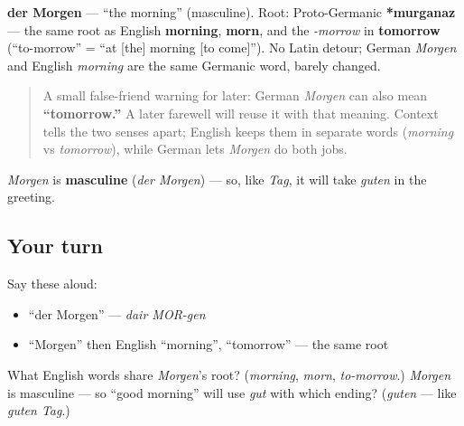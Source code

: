 \begin{cousinweb}
\textbf{der Morgen} — \textquotedblleft{}the morning\textquotedblright{} (masculine). Root: Proto-Germanic \textbf{*murganaz} — the same root as English \textbf{morning}, \textbf{morn}, and the \emph{-morrow} in \textbf{tomorrow} (\textquotedblleft{}to-morrow\textquotedblright{} = \textquotedblleft{}at {[}the{]} morning {[}to come{]}\textquotedblright{}). No Latin detour; German \emph{Morgen} and English \emph{morning} are the same Germanic word, barely changed.

\begin{quote}
A small false-friend warning for later: German \emph{Morgen} can also mean \textbf{\textquotedblleft{}tomorrow.\textquotedblright{}} A later farewell will reuse it with that meaning. Context tells the two senses apart; English keeps them in separate words (\emph{morning} vs \emph{tomorrow}), while German lets \emph{Morgen} do both jobs.
\end{quote}
\end{cousinweb}

\begin{grammarlens}[title={Grammar Lens}]
\emph{Morgen} is \textbf{masculine} (\emph{der Morgen}) — so, like \emph{Tag}, it will take \emph{guten} in the greeting.
\end{grammarlens}

\subsection*{Your turn}
Say these aloud:

\begin{itemize}
\raggedright
  \item \textquotedblleft{}der Morgen\textquotedblright{} — \emph{dair MOR-gen}
  \item \textquotedblleft{}Morgen\textquotedblright{} then English \textquotedblleft{}morning\textquotedblright{}, \textquotedblleft{}tomorrow\textquotedblright{} — the same root
\end{itemize}

\begin{tcolorbox}[breakable,colback=teal!4,colframe=teal!35!black,title={Before you move on}]
What English words share \emph{Morgen}'s root? (\emph{morning}, \emph{morn}, \emph{to-morrow}.) \emph{Morgen} is masculine — so \textquotedblleft{}good morning\textquotedblright{} will use \emph{gut} with which ending? (\emph{guten} — like \emph{guten Tag}.)
\end{tcolorbox}
